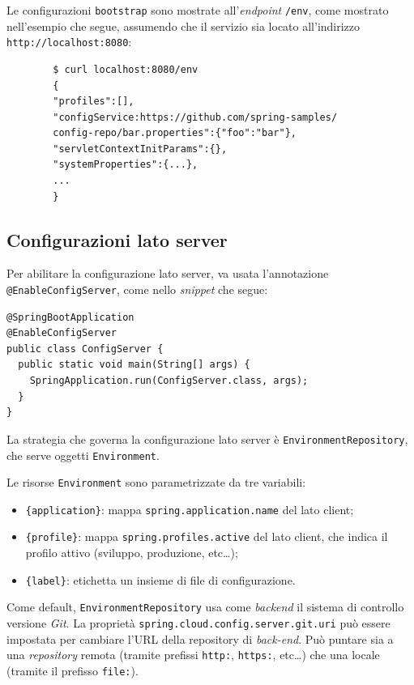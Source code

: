 Le configurazioni \texttt{bootstrap} sono mostrate all'\textit{endpoint} \texttt{/env}, come mostrato nell'esempio che segue, assumendo che il servizio sia locato all'indirizzo \texttt{http://localhost:8080}:

\begin{tcolorbox}
	\begin{verbatim}
		$ curl localhost:8080/env
		{
		"profiles":[],
		"configService:https://github.com/spring-samples/
		config-repo/bar.properties":{"foo":"bar"},
		"servletContextInitParams":{},
		"systemProperties":{...},
		...
		}
	\end{verbatim}
\end{tcolorbox}

\subsection{Configurazioni lato server} Per abilitare la configurazione lato server, va usata l'annotazione \texttt{@EnableConfigServer}, come nello \textit{snippet} che segue:

\begin{tcolorbox}
	\begin{lstlisting}
@SpringBootApplication
@EnableConfigServer
public class ConfigServer {
  public static void main(String[] args) {
    SpringApplication.run(ConfigServer.class, args);
  }
}
	\end{lstlisting}
\end{tcolorbox}

La strategia che governa la configurazione lato server è \texttt{EnvironmentRepository}, che serve oggetti \texttt{Environment}.

Le risorse \texttt{Environment} sono parametrizzate da tre variabili:
\begin{itemize}
	\item \texttt{\{application\}}: mappa \texttt{spring.application.name} del lato client;
	\item \texttt{\{profile\}}: mappa \texttt{spring.profiles.active} del lato client, che indica il profilo attivo (sviluppo, produzione, etc\dots);
	\item \texttt{\{label\}}: etichetta un insieme di file di configurazione.
\end{itemize}

Come default, \texttt{EnvironmentRepository} usa come \textit{backend} il sistema di controllo versione \textit{Git}.
La proprietà \texttt{spring.cloud.config.server.git.uri} può essere impostata per cambiare l'URL della repository di \textit{back-end}.
Può puntare sia a una \textit{repository} remota (tramite prefissi \texttt{http:}, \texttt{https:}, etc\dots) che una locale (tramite il prefisso \texttt{file:}).

